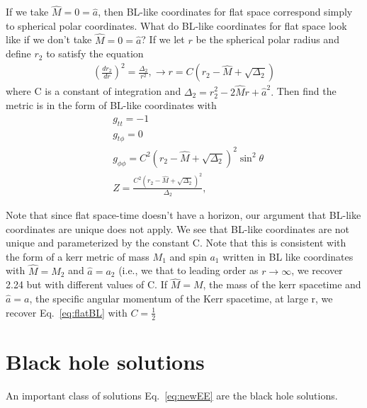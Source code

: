 \documentclass[aps,prd,amsmath,showpacs,amssymb,superscriptaddress,nofootinbib,longbibliography,eqsecnum,preprintnumbers]{revtex4-1}
\begin{document}
If we take $\hat M =0=\hat a$, then BL-like coordinates for flat space correspond simply to spherical polar coordinates. What do BL-like coordinates for flat space look like if we don't take $\hat M = 0 =\hat a$? If we let $r$ be the spherical polar radius and define $r_2$ to satisfy the equation
\begin{align}
\left(\frac{dr_2}{dr}\right)^2 =\frac{\Delta_2}{r^2}, \label{eq:r2} \to r= C\left(r_2-\hat M +\sqrt{\Delta_2}\right)
\end{align}
where C is a constant of integration and $\Delta_2=r_2^2-2\hat M r +\hat a^2.$
Then find the metric is in the form of BL-like coordinates with 
\begin{align}
&g_{tt}= -1 \nonumber \\
&g_{t\phi}=0 \nonumber \\
&g_{\phi\phi}=C^2(r_2-\hat M +\sqrt{\Delta_2})^2\sin^2\theta \nonumber \\
&Z=\frac{C^2(r_2-\hat M +\sqrt{\Delta_2})^2}{\Delta_2}, \label{eq:flatBL}
\end{align}

Note that since flat space-time doesn't have a horizon, our argument that BL-like coordinates are unique does not apply. We see that BL-like coordinates are not unique and parameterized by the constant C. Note that this is consistent with the form of a kerr metric of mass $M_1$ and spin $a_1$ written in BL like coordinates with $\hat M=M_2$ and $\hat a=a_2$ (i.e., we that to leading order as $r\to \infty$, we recover 2.24 but with different values of C. If $\hat M =M$, the mass of the kerr spacetime and $\hat a = a$, the specific angular momentum of the Kerr spacetime, at large r, we recover Eq.~\eqref{eq:flatBL} with $C=\frac{1}{2}$


  

\section{Black hole solutions}
%
An important class of solutions Eq.~\eqref{eq:newEE} are the black hole solutions. 
\end{document}
